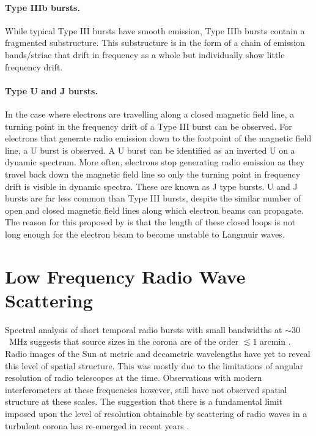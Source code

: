 \paragraph{Type IIIb bursts.}

While typical Type III bursts have smooth emission, Type IIIb bursts contain a fragmented substructure. This substructure is in the form of a chain of emission bands/striae that drift in frequency as a whole but individually show little frequency drift.

\paragraph{Type U and J bursts.}

In the case where electrons are travelling along a closed magnetic field line, a turning point in the frequency drift of a Type III burst can be observed. For electrons that generate radio emission down to the footpoint of the magnetic field line, a U burst is observed. A U burst can be identified as an inverted U on a dynamic spectrum. More often, electrons stop generating radio emission as they travel back down the magnetic field line so only the turning point in frequency drift is visible in dynamic spectra. These are known as J type bursts. U and J bursts are far less common than Type III bursts, despite the similar number of open and closed magnetic field lines along which electron beams can propagate. The reason for this proposed by \cite{Reid2017} is that the length of these closed loops is not long enough for the electron beam to become unstable to Langmuir waves.

\section{Low Frequency Radio Wave Scattering}

Spectral analysis of short temporal radio bursts with small bandwidths at $\sim 30$~MHz suggests that source sizes in the corona are of the order $\lesssim 1$ arcmin \citep{McConnell1980, Kontar2017}. Radio images of the Sun at metric and decametric wavelengths have yet to reveal this level of spatial structure. This was mostly due to the limitations of angular resolution of radio telescopes at the time. 
Observations with modern interferometers at these frequencies however, still have not observed spatial structure at these scales. The suggestion that there is a fundamental limit imposed upon the level of resolution obtainable by scattering of radio waves in a turbulent corona \citep{Bastian1994} has re-emerged in recent years \citep{Thejappa2007,Thejappa2008,Kontar2017,Kontar2019}. 

